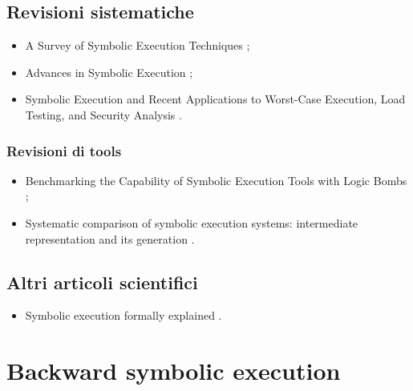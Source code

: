 \subsection*{Revisioni sistematiche}
\begin{itemize}

\item A Survey of Symbolic Execution Techniques \cite{baldoni2018symbexereview};

\item Advances in Symbolic Execution \cite{yang2019symbexereview};

\item Symbolic Execution and Recent Applications to Worst-Case Execution, Load Testing, and Security Analysis \cite{pasareanu2019symbexereview}.

\end{itemize}

\subsubsection*{Revisioni di tools}
\begin{itemize}

\item Benchmarking the Capability of Symbolic Execution Tools with Logic Bombs \cite{xu2020symbexetools};

\item Systematic comparison of symbolic execution systems: intermediate representation and its generation \cite{poeplau2019symbexetools}.

\end{itemize}

\subsection*{Altri articoli scientifici}
\begin{itemize}

\item Symbolic execution formally explained \cite{boer2021symbexe}.

\end{itemize}

\section*{Backward symbolic execution}

